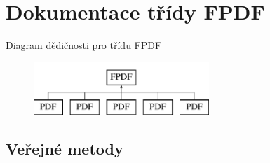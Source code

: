 \hypertarget{class_f_p_d_f}{\section{Dokumentace třídy F\-P\-D\-F}
\label{class_f_p_d_f}
}
Diagram dědičnosti pro třídu F\-P\-D\-F\begin{figure}[H]
\begin{center}
\leavevmode
\includegraphics[height=2.000000cm]{class_f_p_d_f}
\end{center}
\end{figure}
\subsection*{Veřejné metody}
